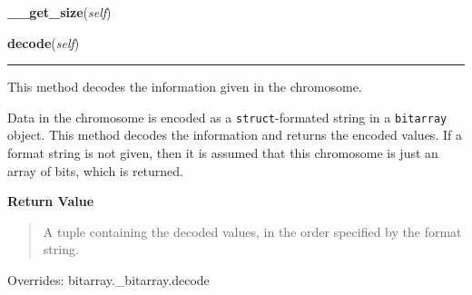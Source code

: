     \label{peach:ga:chromosome:Chromosome:__get_size}

    \vspace{0.5ex}

    \begin{boxedminipage}{\textwidth}

    \raggedright \textbf{\_\_get\_size}(\textit{self})

    \end{boxedminipage}

    \vspace{0.5ex}

    \begin{boxedminipage}{\textwidth}

    \raggedright \textbf{decode}(\textit{self})

    \vspace{-1.5ex}

    \rule{\textwidth}{0.5\fboxrule}

This method decodes the information given in the chromosome.

Data in the chromosome is encoded as a \texttt{struct}-formated string in a
\texttt{bitarray} object. This method decodes the information and returns the
encoded values. If a format string is not given, then it is assumed that
this chromosome is just an array of bits, which is returned.
    \vspace{1ex}

      \textbf{Return Value}
      \begin{quote}

A tuple containing the decoded values, in the order specified by the
format string.
      \end{quote}

    \vspace{1ex}

      Overrides: bitarray.\_bitarray.decode

    \end{boxedminipage}

    \vspace{0.5ex}

